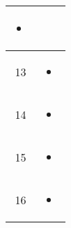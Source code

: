 \begin{center}
\begin{longtable}{|c|p{12cm}|}
\begin{itemize}
  \item 
\end{itemize}
\\ \hline
13 & 
\begin{itemize}
  \item 
\end{itemize}
\\ \hline
14 & 
\begin{itemize}
  \item 
\end{itemize}
\\ \hline
15 & 
\begin{itemize}
  \item 
\end{itemize}
\\ \hline
16 & 
\begin{itemize}
  \item 
\end{itemize}
\\ \hline
\end{longtable}
\end{center}
